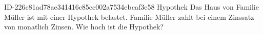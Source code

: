 \begin{exercise}
      {ID-226c81ad78ae341416c85cc002a7534ebcaf3e58}
      {Hypothek}
  \ifproblem\problem
    Das Haus von Familie Müller ist mit einer Hypothek belastet. Familie
    Müller zahlt bei einem Zinssatz von  monatlich 
    Zinsen. Wie hoch ist die Hypothek?
  \fi
\end{exercise}
